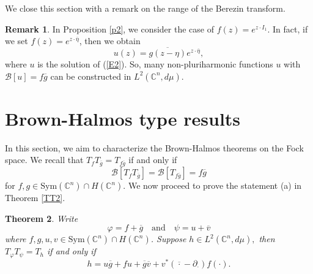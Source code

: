 \documentclass[11pt,reqno]{amsart}
\newtheorem{theorem}{Theorem}
\theoremstyle{definition}
\newtheorem{remark}[theorem]{Remark}
\begin{document}
We close this section with a remark on the range of the Berezin transform.
\begin{remark}\label{r1}
In Proposition \ref{p2}, we consider the case of $f(z)=e^{z\cdot I_1}$. In fact, if we set $f(z)=e^{z\cdot \overline{\eta}}$, then we obtain
$$u(z)=\overline{g(z-\eta)}e^{z\cdot \overline{\eta}},$$
where $u$ is the solution  of (\ref{E2}). So, many non-pluriharmonic functions $u$ with $\mathcal{B}[u]=f\overline{g}$ can be constructed in $L^2(\mathbb{C}^n,d\mu).$
\end{remark}
\section{Brown-Halmos type results}\label{s3}
In this section, we aim to characterize the Brown-Halmos theorems on the Fock space. We recall that
$T_fT_{\overline{g}}=T_{f\overline{g}}$ if and only if $$\mathcal{B}[T_fT_{\overline{g}}]=\mathcal{B}[T_{f\overline{g}}]=f\overline{g}$$
for $f,g\in\text{Sym}(\mathbb{C}^n)\cap H(\mathbb{C}^n).$ We now proceed to prove the statement (a) in Theorem \ref{TT2}.
\begin{theorem}\label{t1}
  Write
$$\varphi=f+\overline{g}\quad\text{and}\quad\psi=u+\overline{v}$$
where $f,g,u,v\in \text{Sym}(\mathbb{C}^n)\cap H(\mathbb{C}^n)$.
Suppose $h\in L^2(\mathbb{C}^n,d\mu),$ then $T_\varphi T_\psi=T_h$ if and only if
$$h=u\overline{g}+fu+\overline{g}\overline{v}+v^*({\overline{\cdot}}-\partial_\cdot) f(\cdot).$$
\end{theorem}
\end{document}
